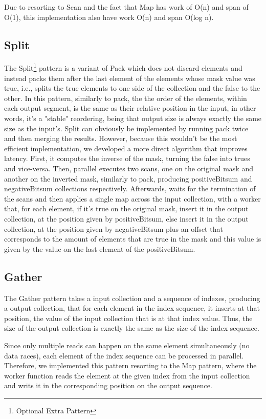 \documentclass[conference,compsoc]{IEEEtran}
\begin{document}
Due to resorting to Scan and the fact that Map has work of O(n) and span of O(1), this implementation also have work O(n) and span O(log n).

\subsection{Split}

The Split\footnote[1]{Optional Extra Pattern} pattern is a variant of Pack which does not discard elements and instead packs them after the last element of the elements whose mask value was true, i.e., splits the true elements to one side of the collection and the false to the other.
In this pattern, similarly to pack, the the order of the elements, within each output segment, is the same as their relative position in the input, in other words, it's a "stable" reordering, being that output size is always exactly the same size as the input's.
Split can obviously be implemented by running pack twice and then merging the results. However, because this wouldn't be the most efficient implementation, we developed a more direct algorithm that improves latency. First, it computes the inverse of the mask, turning the false into trues and vice-versa. Then, parallel executes two scans, one on the original mask and another on the inverted mask, similarly to pack, producing positiveBitsum and negativeBitsum collections respectively. Afterwards, waits for the termination of the scans and then applies a single map across the input collection, with a worker that, for each element, if it's true on the original mask, insert it in the output collection, at the position given by positiveBitsum, else insert it in the output collection, at the position given by negativeBitsum plus an offset that corresponds to the amount of elements that are true in the mask and this value is given by the value on the last element of the positiveBitsum.

\subsection{Gather}

The Gather pattern takes a input collection and a sequence of indexes, producing a output collection,
that for each element in the index sequence, it inserts at that position, the value of the input collection that is at that index value. Thus, the size of the output collection is exactly the same as the size of the index sequence.

Since only multiple reads can happen on the same element simultaneously (no data races), each element of the index sequence can be processed in parallel.
Therefore, we implemented this pattern resorting to the Map pattern, where the worker function reads the element at the given index from the input collection and writs it in the corresponding position on the output sequence.
\end{document}
